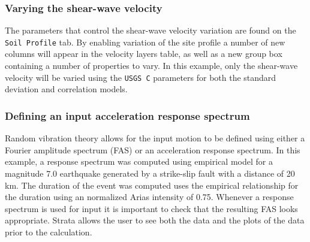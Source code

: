 \documentclass[11pt]{report}
\begin{document}
\subsubsection{Varying the shear-wave velocity}
The parameters that control the shear-wave velocity variation are found on the \texttt{Soil Profile}
tab.  By enabling variation of the site profile a number of new columns will appear in the velocity
layers table, as well as a new group box containing a number of properties to vary.  In this
example, only the shear-wave velocity will be varied using the \texttt{USGS C} parameters for both
the standard deviation and correlation models.

\subsubsection{Defining an input acceleration response spectrum}
Random vibration theory allows for the input motion to be defined using either a Fourier amplitude
spectrum (FAS) or an acceleration response spectrum.  In this example, a response spectrum was computed
using \citet{abrahamson:97} empirical model for a magnitude 7.0 earthquake generated by a
strike-slip fault with a distance of 20 km.  The duration of the event was computed uses the
\citet{abrahamson:96} empirical relationship for the duration using an normalized Arias intensity of
0.75.  Whenever a response spectrum is used for input it is important to check that the resulting
FAS looks appropriate.  Strata allows the user to see both the data and the plots of the data prior
to the calculation.


\newpage


\newpage
\printindex
\end{document}
